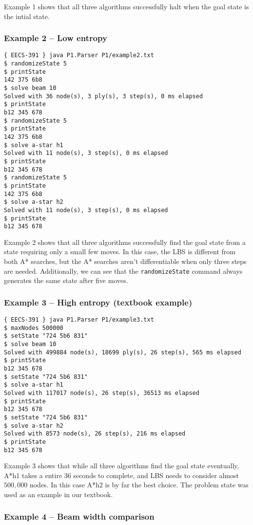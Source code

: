 \documentclass[letterpaper]{article}
\begin{document}
Example 1 shows that all three algorithms successfully halt when
the goal state is the intial state.

\subsubsection*{Example 2 -- Low entropy}

\begin{verbatim}
{ EECS-391 } java P1.Parser P1/example2.txt
$ randomizeState 5
$ printState
142 375 6b8
$ solve beam 10
Solved with 36 node(s), 3 ply(s), 3 step(s), 0 ms elapsed
$ printState
b12 345 678
$ randomizeState 5
$ printState
142 375 6b8
$ solve a-star h1
Solved with 11 node(s), 3 step(s), 0 ms elapsed
$ printState
b12 345 678
$ randomizeState 5
$ printState
142 375 6b8
$ solve a-star h2
Solved with 11 node(s), 3 step(s), 0 ms elapsed
$ printState
b12 345 678
\end{verbatim}

Example 2 shows that all three algorithms successfully find the goal state
from a state requiring only a small few moves. In this case, the LBS is
different from both A* searches, but the A* searches aren't differentiable
when only three steps are needed. Additionally, we can see that the
\texttt{randomizeState} command always generates the same state after five
moves.

\subsubsection*{Example 3 -- High entropy (textbook example)}

\begin{verbatim}
{ EECS-391 } java P1.Parser P1/example3.txt
$ maxNodes 500000
$ setState "724 5b6 831"
$ solve beam 10
Solved with 499884 node(s), 18699 ply(s), 26 step(s), 565 ms elapsed
$ printState
b12 345 678
$ setState "724 5b6 831"
$ solve a-star h1
Solved with 117017 node(s), 26 step(s), 36513 ms elapsed
$ printState
b12 345 678
$ setState "724 5b6 831"
$ solve a-star h2
Solved with 8573 node(s), 26 step(s), 216 ms elapsed
$ printState
b12 345 678
\end{verbatim}

Example 3 shows that while all three algorithms find the goal state eventually,
A*h1 takes a entire 36 seconds to complete, and LBS needs to consider almost
$500,000$ nodes. In this case A*h2 is by far the best choice. The problem state
was used as an example in our textbook.

\subsubsection*{Example 4 -- Beam width comparison}
\end{document}
